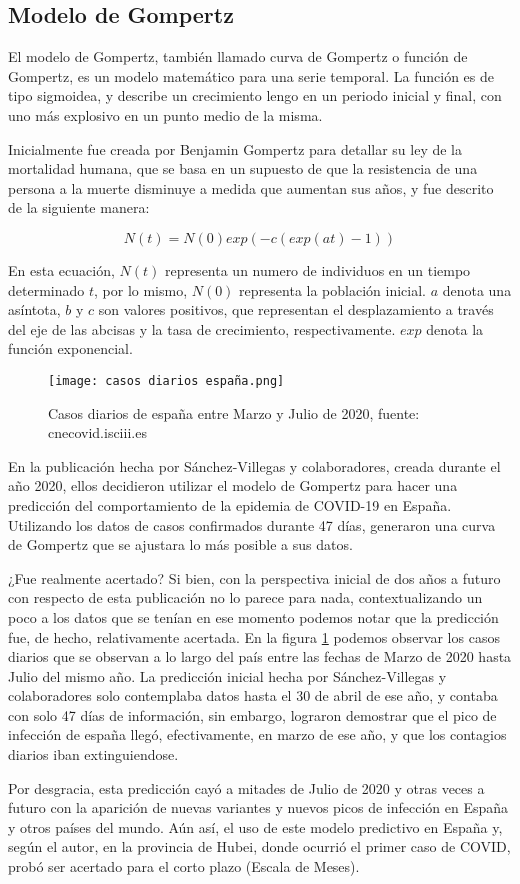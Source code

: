 \subsection{Modelo de Gompertz}
El modelo de Gompertz, también llamado curva de Gompertz o función de Gompertz, es un modelo matemático para una serie temporal. La función es de tipo sigmoidea, y describe un crecimiento lengo en un periodo inicial y final, con uno más explosivo en un punto medio de la misma.

Inicialmente fue creada por Benjamin Gompertz para detallar su ley de la mortalidad humana, que se basa en un supuesto de que la resistencia de una persona a la muerte disminuye a medida que aumentan sus años, y fue descrito de la siguiente manera:

\begin{equation}
    N(t) = N(0) exp( -c ( exp(at) - 1))
\end{equation}

En esta ecuación, $N(t)$ representa un numero de individuos en un tiempo determinado $t$, por lo mismo, $N(0)$ representa la población inicial. $a$ denota una asíntota, $b$ y $c$ son valores positivos, que representan el desplazamiento a través del eje de las abcisas y la tasa de crecimiento, respectivamente. $exp$ denota la función exponencial.

\begin{figure*}
    \texttt{[image: casos diarios españa.png]}
    \caption{Casos diarios de españa entre Marzo y Julio de 2020, fuente: cnecovid.isciii.es}
    \label{diarios españa}
\end{figure*}

En la publicación hecha por Sánchez-Villegas y colaboradores\cite{sanchez-villegas_codina_2020}, creada durante el año 2020, ellos decidieron utilizar el modelo de Gompertz para hacer una predicción del comportamiento de la epidemia de COVID-19 en España. Utilizando los datos de casos confirmados durante 47 días, generaron una curva de Gompertz que se ajustara lo más posible a sus datos.

¿Fue realmente acertado? Si bien, con la perspectiva inicial de dos años a futuro con respecto de esta publicación no lo parece para nada, contextualizando un poco a los datos que se tenían en ese momento podemos notar que la predicción fue, de hecho, relativamente acertada. En la figura \ref{diarios españa} podemos observar los casos diarios que se observan a lo largo del país entre las fechas de Marzo de 2020 hasta Julio del mismo año. La predicción inicial hecha por Sánchez-Villegas y colaboradores solo contemplaba datos hasta el 30 de abril de ese año, y contaba con solo 47 días de información, sin embargo, lograron demostrar que el pico de infección de españa llegó, efectivamente, en marzo de ese año, y que los contagios diarios iban extinguiendose.

Por desgracia, esta predicción cayó a mitades de Julio de 2020 y otras veces a futuro con la aparición de nuevas variantes y nuevos picos de infección en España y otros países del mundo. Aún así, el uso de este modelo predictivo en España y, según el autor, en la provincia de Hubei, donde ocurrió el primer caso de COVID, probó ser acertado para el corto plazo (Escala de Meses).

